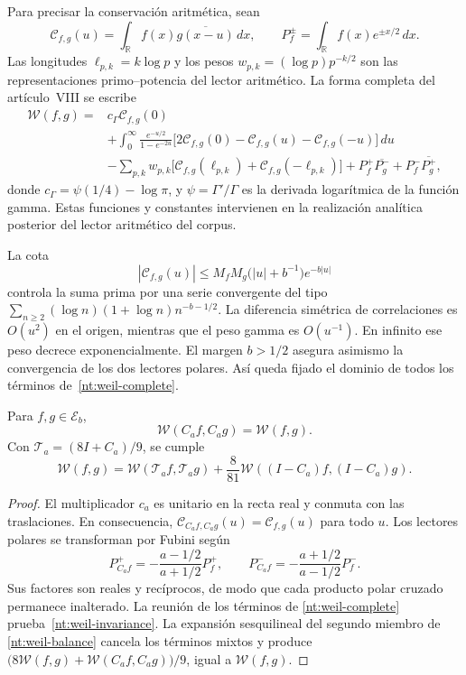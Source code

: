 Para precisar la conservación aritmética, sean
\[
 \mathcal C_{f,g}(u)
 =\int_{\mathbb R}f(x)\overline{g(x-u)}\,dx,
 \qquad
 P_f^\pm=\int_{\mathbb R}f(x)e^{\pm x/2}\,dx.
\]
Las longitudes \(\ell_{p,k}=k\log p\) y los pesos
\(w_{p,k}=(\log p)p^{-k/2}\) son las representaciones
primo--potencia del lector aritmético. La forma completa
del artículo~VIII se escribe
\begin{equation}
 \begin{split}
 \mathscr W(f,g)={}&c_\Gamma\mathcal C_{f,g}(0)\\
 &+\int_0^\infty\frac{e^{-u/2}}{1-e^{-2u}}
 \bigl[2\mathcal C_{f,g}(0)
       -\mathcal C_{f,g}(u)-\mathcal C_{f,g}(-u)\bigr]\,du\\
 &-\sum_{p,k}w_{p,k}
   \bigl[\mathcal C_{f,g}(\ell_{p,k})
        +\mathcal C_{f,g}(-\ell_{p,k})\bigr]
 +P_f^+\overline{P_g^-}+P_f^-\overline{P_g^+},
 \end{split}
 \label{nt:weil-complete}
\end{equation}
donde \(c_\Gamma=\psi(1/4)-\log\pi\), y
\(\psi=\Gamma'/\Gamma\) es la derivada logarítmica de la
función gamma. Estas funciones y constantes intervienen
en la realización analítica posterior del lector
aritmético del corpus.

La cota
\[
 |\mathcal C_{f,g}(u)|
 \leq M_fM_g\bigl(|u|+b^{-1}\bigr)e^{-b|u|}
\]
controla la suma prima por una serie convergente del tipo
\(\sum_{n\geq2}(\log n)(1+\log n)n^{-b-1/2}\).
La diferencia simétrica de correlaciones es \(O(u^2)\)
en el origen, mientras que el peso gamma es \(O(u^{-1})\).
En infinito ese peso decrece exponencialmente.
El margen \(b>1/2\) asegura asimismo la convergencia de
los dos lectores polares. Así queda fijado el dominio
de todos los términos de~\eqref{nt:weil-complete}.

\begin{proposition}
Para \(f,g\in\mathscr E_b\),
\begin{equation}
 \mathscr W(C_af,C_ag)=\mathscr W(f,g).
 \label{nt:weil-invariance}
\end{equation}
Con \(\mathcal T_a=(8I+C_a)/9\), se cumple
\begin{equation}
 \mathscr W(f,g)
 =\mathscr W(\mathcal T_af,\mathcal T_ag)
 +\frac8{81}\mathscr W((I-C_a)f,(I-C_a)g).
 \label{nt:weil-balance}
\end{equation}
\end{proposition}

\begin{proof}
El multiplicador \(c_a\) es unitario en la recta real y
conmuta con las traslaciones. En consecuencia,
\(\mathcal C_{C_af,C_ag}(u)=\mathcal C_{f,g}(u)\)
para todo \(u\). Los lectores polares se transforman
por Fubini según
\[
 P_{C_af}^+
 =-\frac{a-1/2}{a+1/2}P_f^+,\qquad
 P_{C_af}^-
 =-\frac{a+1/2}{a-1/2}P_f^-.
\]
Sus factores son reales y recíprocos, de modo que
cada producto polar cruzado permanece inalterado.
La reunión de los términos de
\eqref{nt:weil-complete} prueba~\eqref{nt:weil-invariance}.
La expansión sesquilineal del segundo miembro de
\eqref{nt:weil-balance} cancela los términos mixtos y
produce
\(\bigl(8\mathscr W(f,g)+
\mathscr W(C_af,C_ag)\bigr)/9\), igual a
\(\mathscr W(f,g)\).
\end{proof}

